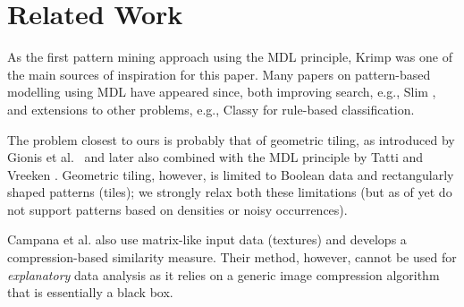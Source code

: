 \documentclass{llncs}
\begin{document}
\section{Related Work}

As the first pattern mining approach using the MDL principle, Krimp \cite{krimp} was one of the main sources of inspiration for this paper. Many papers on pattern-based modelling using MDL have appeared since, both improving search, e.g., Slim \cite{slim}, and extensions to other problems, e.g., Classy \cite{classy} for rule-based classification.

The problem closest to ours is probably that of geometric tiling, as introduced by Gionis et al.\ \cite{gionis2004tiles} and later also combined with the MDL principle by Tatti and Vreeken \cite{tatti2012stijl}. Geometric tiling, however, is limited to Boolean data and rectangularly shaped patterns (tiles); we strongly relax both these limitations (but as of yet do not support patterns based on densities or noisy occurrences).

Campana et al. \cite{campana2010compression} also use matrix-like input data (textures) and develops a compression-based similarity measure. Their method, however, cannot be used for \emph{explanatory} data analysis as it relies on a generic image compression algorithm that is essentially a black box.

\end{document}
